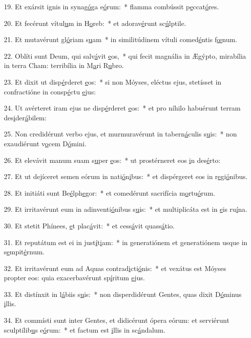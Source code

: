 19. Et exársit ignis in synag\uline{ó}ga e\uline{ó}rum:~* flamma combússit p\uline{e}ccat\uline{ó}res.\par 
20. Et fecérunt vítul\uline{u}m in H\uline{o}reb:~* et adorav\uline{é}runt sc\uline{ú}lptile.\par 
21. Et mutavérunt gl\uline{ó}riam s\uline{u}am~* in similitúdinem vítuli comed\uline{é}ntis f\uline{œ}num.\par 
22. Oblíti sunt Deum, qui salv\uline{á}vit \uline{e}os,~* qui fecit magnália in Ægýpto, mirabília in terra Cham: terribília in M\uline{a}ri R\uline{u}bro.\par 
23. Et dixit ut disp\uline{é}rderet \uline{e}os:~* si non Móyses, eléctus ejus, stetísset in confractióne in consp\uline{é}ctu \uline{e}jus:\par 
24. Ut avérteret iram ejus ne disp\uline{é}rderet \uline{e}os:~* et pro níhilo habuérunt terram des\uline{i}der\uline{á}bilem:\par 
25. Non credidérunt verbo ejus, et murmuravérunt in tabern\uline{á}culis s\uline{u}is:~* non exaudiérunt v\uline{o}cem D\uline{ó}mini.\par 
26. Et elevávit manum suam s\uline{u}per \uline{e}os:~* ut prostérneret eos \uline{i}n des\uline{é}rto:\par 
27. Et ut dejíceret semen eórum in nati\uline{ó}n\uline{i}bus:~* et dispérgeret eos in r\uline{e}gi\uline{ó}nibus.\par 
28. Et initiáti sunt Be\uline{é}lph\uline{e}gor:~* et comedérunt sacrifícia m\uline{o}rtu\uline{ó}rum.\par 
29. Et irritavérunt eum in adinventi\uline{ó}nibus s\uline{u}is:~* et multiplicáta est in \uline{e}is ru\uline{í}na.\par 
30. Et stetit Phínees, \uline{e}t plac\uline{á}vit:~* et cess\uline{á}vit quass\uline{á}tio.\par 
31. Et reputátum est ei in just\uline{í}t\uline{i}am:~* in generatiónem et generatiónem usque in s\uline{e}mpit\uline{é}rnum.\par 
32. Et irritavérunt eum ad Aquas contrad\uline{i}cti\uline{ó}nis:~* et vexátus est Móyses propter eos: quia exacerbavérunt sp\uline{í}ritum \uline{e}jus.\par 
33. Et distínxit in l\uline{á}biis s\uline{u}is:~* non disperdidérunt Gentes, quas dixit D\uline{ó}minus \uline{i}llis.\par 
34. Et commísti sunt inter Gentes, et didicérunt ópera eórum: et serviérunt sculptílib\uline{u}s e\uline{ó}rum:~* et factum est \uline{i}llis in sc\uline{á}ndalum.\par 

